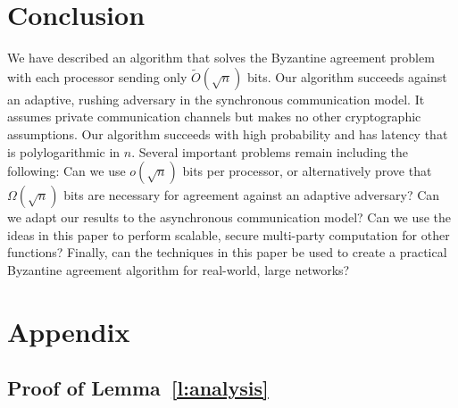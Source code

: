 \documentclass[letterpaper,11pt]{article}
\begin{document}
\section{Conclusion}
We have described an algorithm that solves the Byzantine agreement problem with each processor sending only $\tilde{O}(\sqrt{n})$ bits.  Our algorithm succeeds against an adaptive, rushing adversary in the synchronous communication model.  It assumes private communication channels but makes no other cryptographic assumptions.  Our algorithm succeeds with high probability and has latency that is polylogarithmic in $n$.  Several important problems remain including the following:  Can we use $o(\sqrt{n})$ bits per processor, or alternatively prove that $\Omega(\sqrt{n})$ bits are necessary for agreement against an adaptive adversary?  Can we adapt our results to the asynchronous communication model?  Can we use the ideas in this paper to perform scalable, secure multi-party computation for other functions?  Finally, can the techniques in this paper be used to create a practical Byzantine agreement algorithm for real-world, large networks?

\pagebreak




\appendix

\section{Appendix}

\subsection{Proof of Lemma~\ref{l:analysis}} \label{s:pf-analysis}
\end{document}
